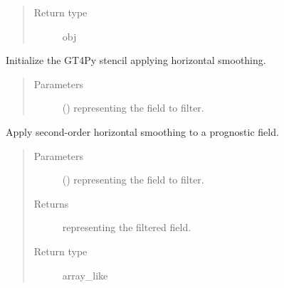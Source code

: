 \documentclass[letterpaper,10pt,english]{sphinxmanual}
\begin{document}
\begin{fulllineitems}
\begin{fulllineitems}
\begin{quote}
\begin{description}
\item[{Return type}] \leavevmode
obj

\end{description}\end{quote}

\end{fulllineitems}


\begin{fulllineitems}
\label{\detokenize{api:dycore.horizontal_smoothing.HorizontalSmoothingSecondOrderYZ._stencil_initialize}}
Initialize the GT4Py stencil applying horizontal smoothing.
\begin{quote}\begin{description}
\item[{Parameters}] \leavevmode
{} () \textendash{}  representing the field to filter.

\end{description}\end{quote}

\end{fulllineitems}


\begin{fulllineitems}
\label{\detokenize{api:dycore.horizontal_smoothing.HorizontalSmoothingSecondOrderYZ.apply}}
Apply second-order horizontal smoothing to a prognostic field.
\begin{quote}\begin{description}
\item[{Parameters}] \leavevmode
{} () \textendash{}  representing the field to filter.

\item[{Returns}] \leavevmode
{} representing the filtered field.

\item[{Return type}] \leavevmode
array\_like

\end{description}\end{quote}

\end{fulllineitems}


\end{fulllineitems}
\end{document}
